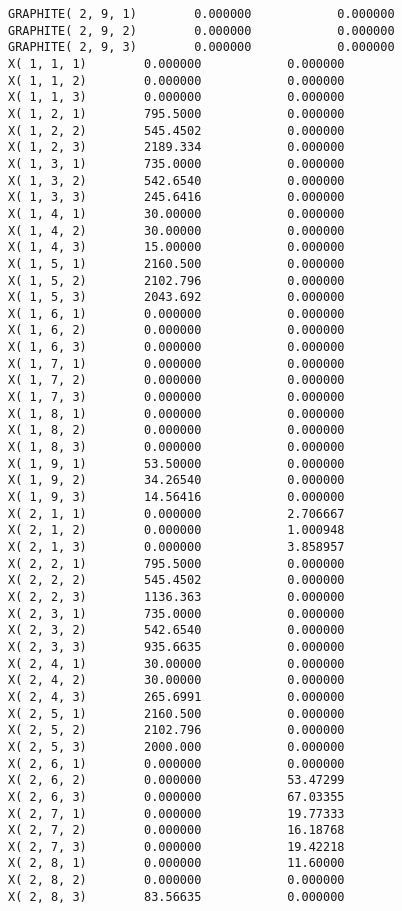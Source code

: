 \documentclass[12pt]{article}
\begin{document}
\begin{appendices}
\begin{lstlisting}
GRAPHITE( 2, 9, 1)        0.000000            0.000000
GRAPHITE( 2, 9, 2)        0.000000            0.000000
GRAPHITE( 2, 9, 3)        0.000000            0.000000
X( 1, 1, 1)        0.000000            0.000000
X( 1, 1, 2)        0.000000            0.000000
X( 1, 1, 3)        0.000000            0.000000
X( 1, 2, 1)        795.5000            0.000000
X( 1, 2, 2)        545.4502            0.000000
X( 1, 2, 3)        2189.334            0.000000
X( 1, 3, 1)        735.0000            0.000000
X( 1, 3, 2)        542.6540            0.000000
X( 1, 3, 3)        245.6416            0.000000
X( 1, 4, 1)        30.00000            0.000000
X( 1, 4, 2)        30.00000            0.000000
X( 1, 4, 3)        15.00000            0.000000
X( 1, 5, 1)        2160.500            0.000000
X( 1, 5, 2)        2102.796            0.000000
X( 1, 5, 3)        2043.692            0.000000
X( 1, 6, 1)        0.000000            0.000000
X( 1, 6, 2)        0.000000            0.000000
X( 1, 6, 3)        0.000000            0.000000
X( 1, 7, 1)        0.000000            0.000000
X( 1, 7, 2)        0.000000            0.000000
X( 1, 7, 3)        0.000000            0.000000
X( 1, 8, 1)        0.000000            0.000000
X( 1, 8, 2)        0.000000            0.000000
X( 1, 8, 3)        0.000000            0.000000
X( 1, 9, 1)        53.50000            0.000000
X( 1, 9, 2)        34.26540            0.000000
X( 1, 9, 3)        14.56416            0.000000
X( 2, 1, 1)        0.000000            2.706667
X( 2, 1, 2)        0.000000            1.000948
X( 2, 1, 3)        0.000000            3.858957
X( 2, 2, 1)        795.5000            0.000000
X( 2, 2, 2)        545.4502            0.000000
X( 2, 2, 3)        1136.363            0.000000
X( 2, 3, 1)        735.0000            0.000000
X( 2, 3, 2)        542.6540            0.000000
X( 2, 3, 3)        935.6635            0.000000
X( 2, 4, 1)        30.00000            0.000000
X( 2, 4, 2)        30.00000            0.000000
X( 2, 4, 3)        265.6991            0.000000
X( 2, 5, 1)        2160.500            0.000000
X( 2, 5, 2)        2102.796            0.000000
X( 2, 5, 3)        2000.000            0.000000
X( 2, 6, 1)        0.000000            0.000000
X( 2, 6, 2)        0.000000            53.47299
X( 2, 6, 3)        0.000000            67.03355
X( 2, 7, 1)        0.000000            19.77333
X( 2, 7, 2)        0.000000            16.18768
X( 2, 7, 3)        0.000000            19.42218
X( 2, 8, 1)        0.000000            11.60000
X( 2, 8, 2)        0.000000            0.000000
X( 2, 8, 3)        83.56635            0.000000

\end{lstlisting}
\end{appendices}
\end{document}
